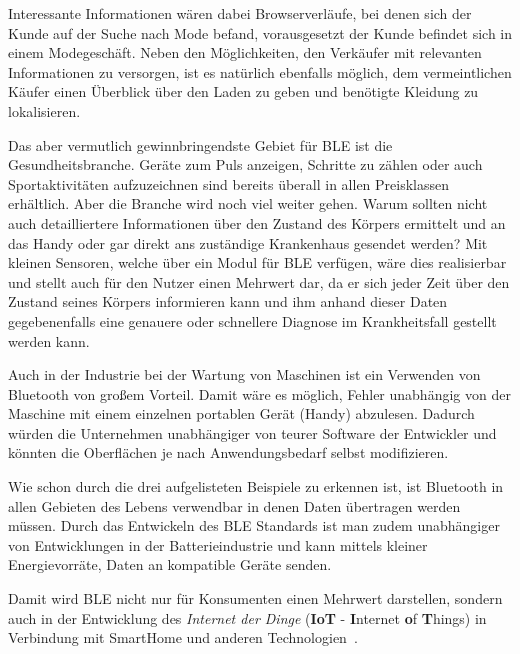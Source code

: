 \begin{multicols}{3}
Interessante Informationen wären dabei Browserverläufe, bei denen sich der Kunde auf der Suche nach Mode befand, vorausgesetzt der Kunde befindet sich in einem Modegeschäft. Neben den Möglichkeiten, den Verkäufer mit relevanten Informationen zu versorgen, ist es natürlich ebenfalls möglich, dem vermeintlichen Käufer einen Überblick über den Laden zu geben und benötigte Kleidung zu lokalisieren.

Das aber vermutlich gewinnbringendste Gebiet für BLE ist die Gesundheitsbranche. Geräte zum Puls anzeigen, Schritte zu zählen oder auch Sportaktivitäten aufzuzeichnen sind bereits überall in allen Preisklassen erhältlich. Aber die Branche wird noch viel weiter gehen. Warum sollten nicht auch detailliertere Informationen über den Zustand des Körpers ermittelt und an das Handy oder gar direkt ans zuständige Krankenhaus gesendet werden? Mit kleinen Sensoren, welche über ein Modul für BLE verfügen, wäre dies realisierbar und stellt auch für den Nutzer einen Mehrwert dar, da er sich jeder Zeit über den Zustand seines Körpers informieren kann und ihm anhand dieser Daten gegebenenfalls eine genauere oder schnellere Diagnose im Krankheitsfall gestellt werden kann.

Auch in der Industrie bei der Wartung von Maschinen ist ein Verwenden von Bluetooth von großem Vorteil. Damit wäre es möglich, Fehler unabhängig von der Maschine mit einem einzelnen portablen Gerät (Handy) abzulesen. Dadurch würden die Unternehmen unabhängiger von teurer Software der Entwickler und könnten die Oberflächen je nach Anwendungsbedarf selbst modifizieren.

Wie schon durch die drei aufgelisteten Beispiele zu erkennen ist, ist Bluetooth in allen Gebieten des Lebens verwendbar in denen Daten übertragen werden müssen. Durch das Entwickeln des BLE Standards ist man zudem unabhängiger von Entwicklungen in der Batterieindustrie und kann mittels kleiner Energievorräte, Daten an kompatible Geräte senden.

Damit wird BLE nicht nur für Konsumenten einen Mehrwert darstellen, sondern auch in der Entwicklung des \textit{Internet der Dinge} (\textbf{IoT} - \textbf{I}nternet \textbf{o}f \textbf{T}hings) in Verbindung mit SmartHome und anderen Technologien~\cite{BLE.1}.

\end{multicols}
